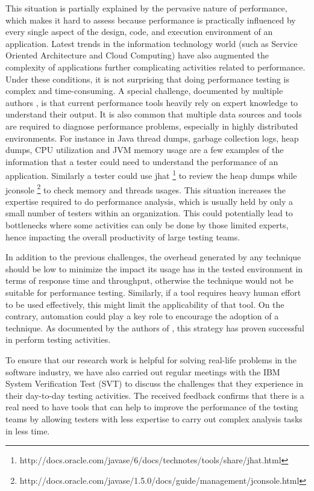 \documentclass[runningheads,a4paper]{llncs}
\begin{document}
This situation is partially explained by the pervasive nature of
performance, which makes it hard to assess because performance is practically
influenced by every single aspect of the design, code, and execution environment
of an application. Latest trends in the information technology world (such as
Service Oriented Architecture and Cloud Computing) have also augmented the
complexity of applications further complicating activities related to
performance. Under these conditions, it is not surprising that doing performance
testing is complex and time-consuming. A special challenge, documented by
multiple authors \cite{Woodside2007,trevor1,Angelopoulos2012}, is that current
performance tools heavily rely on expert knowledge to understand their output.
It is also common that multiple data sources and tools are required to diagnose
performance problems, especially in highly distributed environments. For
instance in Java thread dumps, garbage collection logs, heap dumps, CPU
utilization and JVM memory usage are a few examples of the information that a
tester could need to understand the performance of an application. Similarly a
tester could use jhat
\footnote{http://docs.oracle.com/javase/6/docs/technotes/tools/share/jhat.html}
to review the heap dumps while jconsole
\footnote{http://docs.oracle.com/javase/1.5.0/docs/guide/management/jconsole.html} 
to check memory and threads usages. This situation increases the expertise
required to do performance analysis, which is usually held by only a small
number of testers within an organization. This could potentially lead to
bottlenecks where some activities can only be done by those limited experts,
hence impacting the overall productivity of large testing teams.

In addition to the previous challenges, the overhead generated by any technique
should be low to minimize the impact its usage has in the tested environment in
terms of response time and throughput, otherwise the technique would not be
suitable for performance testing. Similarly, if a tool requires heavy human
effort to be used effectively, this might limit the applicability of that tool.
On the contrary, automation could play a key role to encourage the adoption of a
technique. As documented by the authors of \cite{Shahamiri1}, this strategy has
proven successful in perform testing activities.

To ensure that our research work is helpful for solving real-life problems in
the software industry, we have also carried out regular meetings with the IBM
System Verification Test (SVT) to discuss the challenges that they experience in
their day-to-day testing activities. The received feedback confirms that there
is a real need to have tools that can help to improve the performance of the
testing teams by allowing testers with less expertise to carry out complex
analysis tasks in less time.
\end{document}
